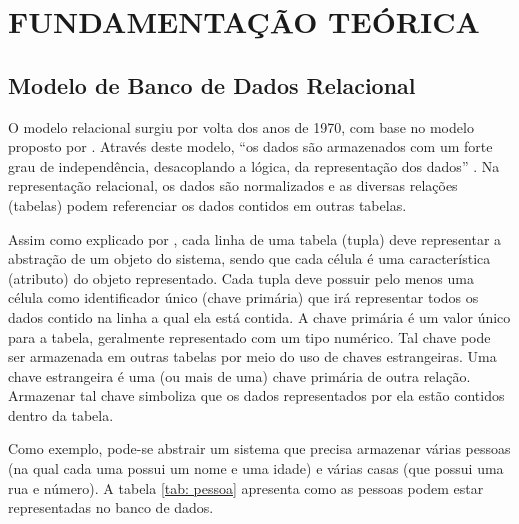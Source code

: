 \chapter{FUNDAMENTAÇÃO TEÓRICA}
\label{FundamentacaoTeorica}

\section{Modelo de Banco de Dados Relacional}

O modelo relacional surgiu por volta dos anos de 1970, com base no modelo proposto por . Através deste modelo, ``os dados são armazenados com um forte grau de independência, desacoplando a lógica, da representação dos dados'' \cite{davoudian2018survey}. Na representação relacional, os dados são normalizados e as diversas relações (tabelas) podem referenciar os dados contidos em outras tabelas.

Assim como explicado por , cada linha de uma tabela (tupla) deve representar a abstração de um objeto do sistema, sendo que cada célula é uma característica (atributo) do objeto representado. Cada tupla deve possuir pelo menos uma célula como identificador único (chave primária) que irá representar todos os dados contido na linha a qual ela está contida. A chave primária é um valor único para a tabela, geralmente representado com um tipo numérico. Tal chave pode ser armazenada em outras tabelas por meio do uso de chaves estrangeiras. Uma chave estrangeira é uma (ou mais de uma) chave primária de outra relação. Armazenar tal chave simboliza que os dados representados por ela estão contidos dentro da tabela.

Como exemplo, pode-se abstrair um sistema que precisa armazenar várias pessoas (na qual cada uma possui um nome e uma idade) e várias casas (que possui uma rua e número). A tabela \ref{tab: pessoa} apresenta como as pessoas podem estar representadas no banco de dados.



